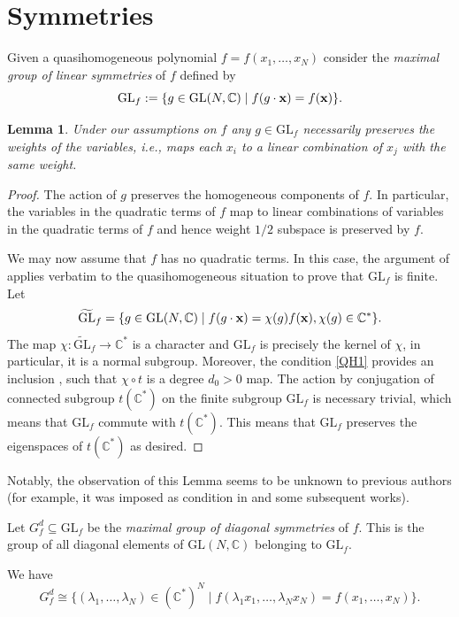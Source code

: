 \documentclass[10pt,a4paper]{article}
\numberwithin{equation}{section}
\newtheorem{Lemma}[Theorem]{Lemma}
\newcommand{\CC}{{\mathbb{C}}}
\newcommand{\GL}{{\mathrm{GL}}}
\newcommand{\bx}{{\bf x}}
\newcommand\wt{\widetilde}
\begin{document}
\section{Symmetries}\label{section: symmetries}
Given a quasihomogeneous polynomial $f = f(x_1,\dots,x_N)$ consider the
\textit{maximal group of linear symmetries} of $f$ defined by
\[
	\GL_f :=  \lbrace g \in \GL(N,\CC) \mid f(g \cdot \bx) = f(\bx) \rbrace.
\]

\begin{Lemma}
 Under our assumptions on $f$ any $g \in \GL_f$ necessarily preserves the weights of the variables, i.e., maps each $x_i$ to a linear combination of $x_j$ with the same weight.
\end{Lemma}
\begin{proof}
The action of $g$ preserves the homogeneous components of $f$. In particular, the variables in the quadratic terms of $f$ map to linear combinations of variables in the quadratic terms of $f$ and hence weight $1/2$ subspace is preserved by $f$.

We may now assume that $f$ has no quadratic terms. In this case, the argument of \cite[Theorem 2.1]{OS78} applies verbatim to the quasihomogeneous situation to prove that $\GL_f$ is finite. Let \[\wt{\GL}_f= \lbrace g \in \GL(N,\CC) \mid f(g \cdot \bx) = \chi(g)f(\bx), \chi(g)\in\CC^*  \rbrace.\]
The map $\chi\colon\wt{\GL}_f\to\CC^*$ is a character and $\GL_f$ is precisely the kernel of $\chi$, in particular, it is a normal subgroup. Moreover, the condition \eqref{QH1} provides an inclusion \smash{$t\colon\CC^*\hookrightarrow\wt{\GL}_f$}, such that $\chi\circ t$ is a degree $d_0>0$ map. The action by conjugation of connected subgroup $t(\CC^*)$ on the finite subgroup $\GL_f$ is necessary trivial, which means that $\GL_f$ commute with $t(\CC^*)$. This means that $\GL_f$ preserves the eigenspaces of $t(\CC^*)$ as desired.
\end{proof}

\begin{Remark}
 Notably, the observation of this Lemma seems to be unknown to previous authors (for example, it was imposed as condition in \cite{Muk} and some subsequent works).
\end{Remark}

Let $G_f^d \subseteq \GL_f$ be the \textit{maximal group of diagonal symmetries} of $f$. This is the group of all diagonal elements of $\GL(N,\CC)$ belonging to $\GL_f$.

We have
\[
	G_f^d \cong \bigl\lbrace (\lambda_1,\dots,\lambda_N) \in (\CC^*)^N \mid f(\lambda_1x_1,\dots,\lambda_Nx_N) = f(x_1,\dots,x_N) \bigr\rbrace.
\]
\end{document}
